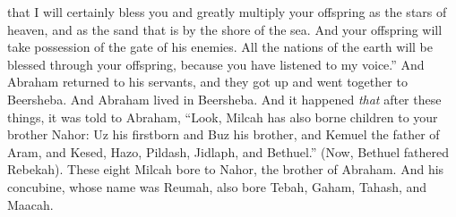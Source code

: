 \begin{biblechapter}
\verse that I will certainly bless you and greatly multiply your offspring as the stars of heaven, and as the sand that is by the shore of the sea. And your offspring will take possession of the gate of his enemies.
\verse All the nations of the earth will be blessed through your offspring, because you have listened to my voice.”
\verse And Abraham returned to his servants, and they got up and went together to Beersheba. And Abraham lived in Beersheba.
\verse And it happened \textit{that} after these things, it was told to Abraham, “Look, Milcah has also borne children to your brother Nahor:
\verse Uz his firstborn and Buz his brother, and Kemuel the father of Aram,
\verse and Kesed, Hazo, Pildash, Jidlaph, and Bethuel.”
\verse (Now, Bethuel fathered Rebekah). These eight Milcah bore to Nahor, the brother of Abraham.
\verse And his concubine, whose name was Reumah, also bore Tebah, Gaham, Tahash, and Maacah.
\end{biblechapter}

